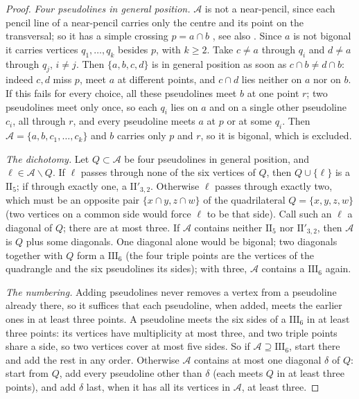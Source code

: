 \documentclass[11pt]{article}
\theoremstyle{definition}
\theoremstyle{plain}\newtheorem*{proposition}{Proposition}\theoremstyle{definition}
\begin{document}
\begin{proof}
\emph{Four pseudolines in general position.} $\mathcal A$ is not a near-pencil, since each pencil line of a near-pencil carries only the centre and its point on the transversal; so it has a simple crossing $p = a \cap b$ \cite[Th.~3.6]{kellyrottenberg}, see also \cite[Th.~1.3]{bokowskipokora}. Since $a$ is not bigonal it carries vertices $q_1, \dots, q_k$ besides $p$, with $k \ge 2$. Take $c \ne a$ through $q_i$ and $d \ne a$ through $q_j$, $i \ne j$. Then $\{a, b, c, d\}$ is in general position as soon as $c \cap b \ne d \cap b$: indeed $c, d$ miss $p$, meet $a$ at different points, and $c \cap d$ lies neither on $a$ nor on $b$. If this fails for every choice, all these pseudolines meet $b$ at one point $r$; two pseudolines meet only once, so each $q_i$ lies on $a$ and on a single other pseudoline $c_i$, all through $r$, and every pseudoline meets $a$ at $p$ or at some $q_i$. Then $\mathcal A = \{a, b, c_1, \dots, c_k\}$ and $b$ carries only $p$ and $r$, so it is bigonal, which is excluded.

\emph{The dichotomy.} Let $Q \subset \mathcal A$ be four pseudolines in general position, and $\ell \in \mathcal A \smallsetminus Q$. If $\ell$ passes through none of the six vertices of $Q$, then $Q \cup \{\ell\}$ is a $\mathrm{II}_5$; if through exactly one, a $\mathrm{II}'_{3,2}$. Otherwise $\ell$ passes through exactly two, which must be an opposite pair $\{x \cap y, z \cap w\}$ of the quadrilateral $Q = \{x,y,z,w\}$ (two vertices on a common side would force $\ell$ to be that side). Call such an $\ell$ a diagonal of $Q$; there are at most three. If $\mathcal A$ contains neither $\mathrm{II}_5$ nor $\mathrm{II}'_{3,2}$, then $\mathcal A$ is $Q$ plus some diagonals. One diagonal alone would be bigonal; two diagonals together with $Q$ form a $\mathrm{III}_6$ (the four triple points are the vertices of the quadrangle and the six pseudolines its sides); with three, $\mathcal A$ contains a $\mathrm{III}_6$ again.

\emph{The numbering.} Adding pseudolines never removes a vertex from a pseudoline already there, so it suffices that each pseudoline, when added, meets the earlier ones in at least three points. A pseudoline meets the six sides of a $\mathrm{III}_6$ in at least three points: its vertices have multiplicity at most three, and two triple points share a side, so two vertices cover at most five sides. So if $\mathcal A \supseteq \mathrm{III}_6$, start there and add the rest in any order. Otherwise $\mathcal A$ contains at most one diagonal $\delta$ of $Q$: start from $Q$, add every pseudoline other than $\delta$ (each meets $Q$ in at least three points), and add $\delta$ last, when it has all its vertices in $\mathcal A$, at least three.
\end{proof}
\end{document}
